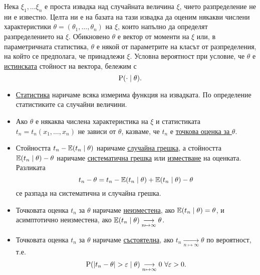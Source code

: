 \documentclass[numbers=endperiod, DIV=15, bibliography=totocnumbered]{scrartcl}
\begin{document}
\begin{definition}[Оценки]
  Нека $\xi_1, \ldots \xi_n$ е проста извадка над случайната величина $\xi$, чието разпределение не ни е известно. Целта ни е на базата на тази извадка да оценим някакви числени характеристики $\theta = (\theta_1, \ldots, \theta_n)$ на $\xi$, които напълно да определят разпределението на $\xi$. Обикновено $\theta$ е вектор от моменти на $\xi$ или, в параметричната статистика, $\theta$ е някой от параметрите на класът от разпределения, на който се предполага, че принадлежи $\xi$. Условна вероятност при условие, че $\theta$ е \uline{истинската} стойност на вектора, бележим с
  \begin{displaymath}
    \operatorname{P}(\cdot \mid \theta).
  \end{displaymath}

  \begin{itemize}
    \item \uline{Статистика} наричаме всяка измерима функция на извадката. По определение статистиките са случайни величини.

    \item Ако $\theta$ е някаква числена характеристика на $\xi$ и статистиката $t_n = t_n(x_1, \ldots, x_n)$ не зависи от $\theta$, казваме, че $t_n$ е \uline{точкова оценка за $\theta$}.


    \item Стойността $t_n - \mathbb{E}(t_n \mid \theta)$ наричаме \uline{случайна грешка}, а стойността $\mathbb{E}(t_n \mid \theta) - \theta$ наричаме \uline{систематична грешка} или \uline{изместване} на оценката. Разликата
    \begin{displaymath}
      t_n - \theta = t_n - \mathbb{E}(t_n \mid \theta) + \mathbb{E}(t_n \mid \theta) - \theta
    \end{displaymath}
    се разпада на систематична и случайна грешка.

    \item Точковата оценка $t_n$ за $\theta$ наричаме \uline{неизместена}, ако $\mathbb{E}(t_n \mid \theta) = \theta$, и асимптотично неизместена, ако $\mathbb{E}(t_n \mid \theta) \underset {n \mapsto \infty} \longrightarrow \theta$.

    \item Точковата оценка $t_n$ за $\theta$ наричаме \uline{състоятелна}, ако $t_n \underset {n \mapsto \infty} \longrightarrow \theta$ по вероятност, т.е.
    \begin{displaymath}
      \operatorname{P}(\left\vert t_n - \theta \right\vert > \varepsilon \mid \theta) \underset {n \mapsto \infty} \longrightarrow 0~\forall \varepsilon > 0.
    \end{displaymath}


\end{itemize}
\end{definition}
\end{document}

